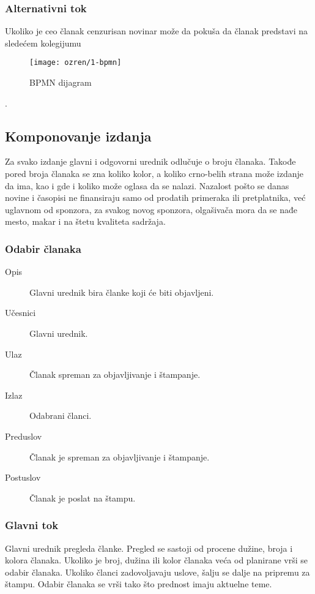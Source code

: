 \subsubsection{Alternativni tok}
Ukoliko je ceo članak cenzurisan novinar može da pokuša da članak predstavi na sledećem kolegijumu 

	

\begin{figure}[h]
    \centering
    \texttt{[image: ozren/1-bpmn]}
    \caption{BPMN dijagram}
    \label{pisanje}
\end{figure}	


.

\subsection{Komponovanje izdanja}
Za svako izdanje glavni i odgovorni urednik odlučuje o broju članaka. Takođe pored broja članaka se zna koliko kolor, a koliko crno-belih strana može izdanje da ima, kao i gde i koliko može oglasa da se nalazi. Nazalost pošto se danas novine i časopisi ne finansiraju samo od prodatih primeraka ili pretplatnika, već uglavnom od sponzora, za svakog novog sponzora, olgašivača mora da se nađe mesto, makar i na štetu kvaliteta sadržaja.

\subsubsection{Odabir članaka}
\begin{description}
\item [Opis] Glavni urednik bira članke koji će biti objavljeni.
\item [Učesnici] Glavni urednik.
\item [Ulaz] Članak spreman za objavljivanje i štampanje.
\item [Izlaz] Odabrani članci.
\item [Preduslov] Članak je spreman za objavljivanje i štampanje.
\item [Postuslov] Članak je poslat na štampu.
\end{description}   
\subsubsection{Glavni tok}
Glavni urednik pregleda članke. Pregled se sastoji od procene dužine, broja i kolora članaka. Ukoliko je broj, dužina ili kolor članaka veća od planirane vrši se odabir članaka. Ukoliko članci zadovoljavaju uslove, šalju se dalje na pripremu za štampu. Odabir članaka se vrši tako što prednost imaju aktuelne teme. 
